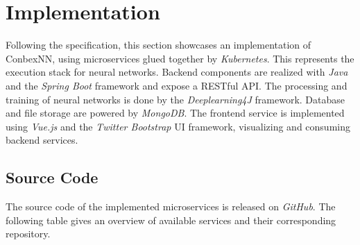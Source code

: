 \chapter{Implementation}\label{implementation}

Following the specification, this section showcases an implementation of
ConbexNN, using microservices glued together by \emph{Kubernetes}. This
represents the execution stack for neural networks. Backend components
are realized with \emph{Java} and the \emph{Spring Boot} framework and
expose a RESTful API. The processing and training of neural networks is
done by the \emph{Deeplearning4J} framework. Database and file storage
are powered by \emph{MongoDB}. The frontend service is implemented using
\emph{Vue.js} and the \emph{Twitter Bootstrap} UI framework, visualizing
and consuming backend services.

\section{Source Code}\label{source-code-1}

The source code of the implemented microservices is released on
\emph{GitHub}. The following table gives an overview of available
services and their corresponding repository.


